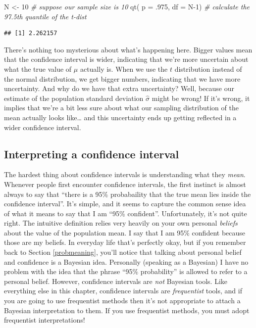 \documentclass[
]{book}
\newenvironment{Shaded}{\begin{snugshade}}{\end{snugshade}}
\newcommand{\AttributeTok}[1]{\textcolor[rgb]{0.77,0.63,0.00}{#1}}
\newcommand{\CommentTok}[1]{\textcolor[rgb]{0.56,0.35,0.01}{\textit{#1}}}
\newcommand{\DecValTok}[1]{\textcolor[rgb]{0.00,0.00,0.81}{#1}}
\newcommand{\FunctionTok}[1]{\textcolor[rgb]{0.00,0.00,0.00}{#1}}
\newcommand{\NormalTok}[1]{#1}
\newcommand{\OtherTok}[1]{\textcolor[rgb]{0.56,0.35,0.01}{#1}}
\begin{document}
\begin{Shaded}
\begin{Highlighting}[]
\NormalTok{N }\OtherTok{\textless{}{-}} \DecValTok{10}   \CommentTok{\# suppose our sample size is 10}
\FunctionTok{qt}\NormalTok{( }\AttributeTok{p =}\NormalTok{ .}\DecValTok{975}\NormalTok{, }\AttributeTok{df =}\NormalTok{ N}\DecValTok{{-}1}\NormalTok{)   }\CommentTok{\# calculate the 97.5th quantile of the t{-}dist}
\end{Highlighting}
\end{Shaded}

\begin{verbatim}
## [1] 2.262157
\end{verbatim}

There's nothing too mysterious about what's happening here. Bigger values mean that the confidence interval is wider, indicating that we're more uncertain about what the true value of \(\mu\) actually is. When we use the \(t\) distribution instead of the normal distribution, we get bigger numbers, indicating that we have more uncertainty. And why do we have that extra uncertainty? Well, because our estimate of the population standard deviation \(\hat\sigma\) might be wrong! If it's wrong, it implies that we're a bit less sure about what our sampling distribution of the mean actually looks like\ldots{} and this uncertainty ends up getting reflected in a wider confidence interval.

\hypertarget{interpreting-a-confidence-interval}{%
\subsection{Interpreting a confidence interval}\label{interpreting-a-confidence-interval}}

The hardest thing about confidence intervals is understanding what they \emph{mean}. Whenever people first encounter confidence intervals, the first instinct is almost always to say that ``there is a 95\% probabaility that the true mean lies inside the confidence interval''. It's simple, and it seems to capture the common sense idea of what it means to say that I am ``95\% confident''. Unfortunately, it's not quite right. The intuitive definition relies very heavily on your own personal \emph{beliefs} about the value of the population mean. I say that I am 95\% confident because those are my beliefs. In everyday life that's perfectly okay, but if you remember back to Section \ref{probmeaning}, you'll notice that talking about personal belief and confidence is a Bayesian idea. Personally (speaking as a Bayesian) I have no problem with the idea that the phrase ``95\% probability'' is allowed to refer to a personal belief. However, confidence intervals are \emph{not} Bayesian tools. Like everything else in this chapter, confidence intervals are \emph{frequentist} tools, and if you are going to use frequentist methods then it's not appropriate to attach a Bayesian interpretation to them. If you use frequentist methods, you must adopt frequentist interpretations!
\end{document}
